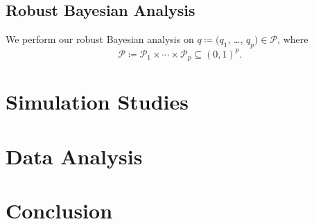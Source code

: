 \documentclass{amsart}
\begin{document}
\subsection{Robust Bayesian Analysis}
We perform our
robust Bayesian analysis on $q\coloneqq(q_1$, \dots, $q_p)\in\mathcal{P}$, where
\begin{equation}
\mathcal{P} \coloneqq \mathcal{P}_1\times\cdots\times\mathcal{P}_p\subseteq \left(0, 1\right)^{p}.
\end{equation}



\section{Simulation Studies}\label{sec:sim}

\section{Data Analysis}\label{sec:data:analysis}

\section{Conclusion}\label{sec:conc}



\end{document}
